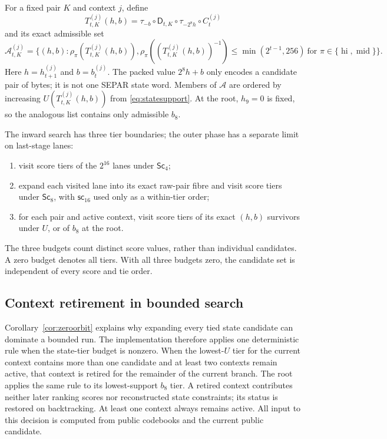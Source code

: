 \documentclass[10pt]{article}
\theoremstyle{plain}
\theoremstyle{definition}
\theoremstyle{remark}
\newcommand{\D}{\mathsf D}
\newcommand{\hi}{\operatorname{hi}}
\newcommand{\midb}{\operatorname{mid}}
\begin{document}
For a fixed pair \(K\) and context \(j\), define
\begin{equation}
 T_{t,K}^{(j)}(h,b)=
 \tau_{-b}\circ\D_{t,K}\circ\tau_{-2^8h}\circ C_t^{(j)}
 \label{eq:jointcandidate}
\end{equation}
and its exact admissible set
\begin{equation}
 \mathcal A_{t,K}^{(j)}=
 \{(h,b):\rho_\pi(T_{t,K}^{(j)}(h,b)),
 \rho_\pi((T_{t,K}^{(j)}(h,b))^{-1})
 \leq\min(2^{t-1},256)\ \text{for }\pi\in\{\hi,\midb\}\}.
 \label{eq:admissible}
\end{equation}
Here \(h=h_{t+1}^{(j)}\) and \(b=b_t^{(j)}\).  The packed value
\(2^8h+b\) only encodes a candidate pair of bytes; it is not one SEPAR state
word.  Members of \(\mathcal A\) are ordered by increasing
\(U(T_{t,K}^{(j)}(h,b))\) from \eqref{eq:statesupport}.  At the root, \(h_9=0\)
is fixed, so the analogous list contains only admissible \(b_8\).

The inward search has three tier boundaries; the outer phase has a separate
limit on last-stage lanes:
\begin{enumerate}
\item visit score tiers of the \(2^{16}\) lanes under
\(\mathsf{Sc}_4\);
\item expand each visited lane into its exact raw-pair fibre and visit score
tiers under \(\mathsf{Sc}_8\), with \(\mathsf{sc}_{16}\) used only as a within-tier order;
\item for each pair and active context, visit score tiers of its exact
\((h,b)\) survivors under \(U\), or of \(b_8\) at the root.
\end{enumerate}
The three budgets count distinct score values, rather than individual
candidates.  A zero budget denotes all tiers.  With all three budgets zero,
the candidate set is independent of every score and tie order.

\subsection{Context retirement in bounded search}
\label{sec:retirement}

Corollary~\ref{cor:zeroorbit} explains why expanding every tied state
candidate can dominate a bounded run.  The implementation therefore applies
one deterministic rule when the state-tier budget is nonzero.
When the lowest-\(U\) tier for the current context contains more than one
candidate and at least two contexts remain active, that context is retired for
the remainder of the current branch.  The root applies the same rule to its
lowest-support \(b_8\) tier.  A retired context contributes neither later
ranking scores nor reconstructed state constraints; its status is restored on
backtracking.  At least one context always remains active.  All input to this
decision is computed from public codebooks and the current public candidate.
\end{document}
